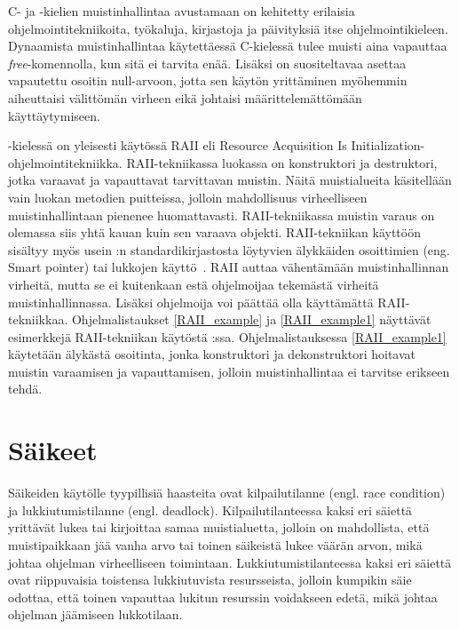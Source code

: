 C- ja \Cpp-kielien muistinhallintaa avustamaan on kehitetty erilaisia ohjelmointitekniikoita, työkaluja, kirjastoja ja päivityksiä itse ohjelmointikieleen. Dynaamista muistinhallintaa käytettäessä C-kielessä tulee muisti aina vapauttaa \textit{free}-komennolla, kun sitä ei tarvita enää. Lisäksi on suositeltavaa asettaa vapautettu osoitin null-arvoon, jotta sen käytön yrittäminen myöhemmin aiheuttaisi välittömän virheen eikä johtaisi määrittelemättömään käyttäytymiseen.

\Cpp -kielessä on yleisesti käytössä RAII eli Resource Acquisition Is Initialization-ohjelmointitekniikka. RAII-tekniikassa luokassa on konstruktori ja destruktori, jotka varaavat ja vapauttavat tarvittavan muistin. Näitä muistialueita käsitellään vain luokan metodien puitteissa, jolloin mahdollisuus virheelliseen muistinhallintaan pienenee huomattavasti. RAII-tekniikassa muistin varaus on olemassa siis yhtä kauan kuin sen varaava objekti. RAII-tekniikan käyttöön sisältyy myös usein \Cpp:n standardikirjastosta löytyvien älykkäiden osoittimien (eng. Smart pointer) tai lukkojen käyttö~\cite{raii}. RAII auttaa vähentämään muistinhallinnan virheitä, mutta se ei kuitenkaan estä ohjelmoijaa tekemästä virheitä muistinhallinnassa. Lisäksi ohjelmoija voi päättää olla käyttämättä RAII-tekniikkaa. Ohjelmalistaukset \ref{RAII_example} ja \ref{RAII_example1} näyttävät esimerkkejä RAII-tekniikan käytöstä \Cpp:ssa. Ohjelmalistauksessa \ref{RAII_example1} käytetään älykästä osoitinta, jonka konstruktori ja dekonstruktori hoitavat muistin varaamisen ja vapauttamisen, jolloin muistinhallintaa ei tarvitse erikseen tehdä.

\begin{minipage}{\linewidth}
 
\end{minipage}

\begin{minipage}{\linewidth}

\end{minipage}

\section{Säikeet}
Säikeiden käytölle tyypillisiä haasteita ovat kilpailutilanne (engl. race condition) ja lukkiutumistilanne (engl. deadlock). Kilpailutilanteessa kaksi eri säiettä yrittävät lukea tai kirjoittaa samaa muistialuetta, jolloin on mahdollista, että muistipaikkaan jää vanha arvo tai toinen säikeistä lukee väärän arvon, mikä johtaa ohjelman virheelliseen toimintaan. Lukkiutumistilanteessa kaksi eri säiettä ovat riippuvaisia toistensa lukkiutuvista resursseista, jolloin kumpikin säie odottaa, että toinen vapauttaa lukitun resurssin voidakseen edetä, mikä johtaa ohjelman jäämiseen lukkotilaan.

